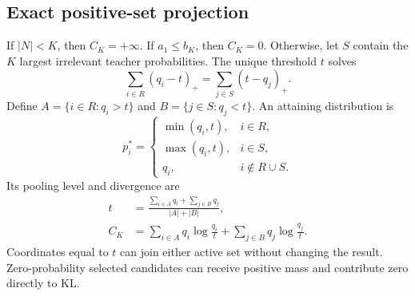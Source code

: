 \subsection{Exact positive-set projection}
\begin{theorem}
\label{thm:exactprojection}
If $|N|<K$, then $C_K=+\infty$.
If $a_1\leq b_K$, then $C_K=0$.
Otherwise, let $S$ contain the $K$ largest irrelevant teacher probabilities.
The unique threshold $t$ solves
\begin{equation}
\sum_{i\in R}(q_i-t)_+=\sum_{j\in S}(t-q_j)_+.
\label{eq:poolbalance}
\end{equation}
Define $A=\{i\in R:q_i>t\}$ and $B=\{j\in S:q_j<t\}$.
An attaining distribution is
\begin{equation}
p_i^*=\begin{cases}
\min(q_i,t),&i\in R,\\
\max(q_i,t),&i\in S,\\
q_i,&i\notin R\cup S.
\end{cases}
\end{equation}
Its pooling level and divergence are
\begin{align}
t&=\frac{\sum_{i\in A}q_i+\sum_{j\in B}q_j}{|A|+|B|},\\
C_K&=\sum_{i\in A}q_i\log\frac{q_i}{t}
+\sum_{j\in B}q_j\log\frac{q_j}{t}.
\label{eq:exactcost}
\end{align}
Coordinates equal to $t$ can join either active set without changing the result.
Zero-probability selected candidates can receive positive mass and contribute zero directly to KL.
\end{theorem}

